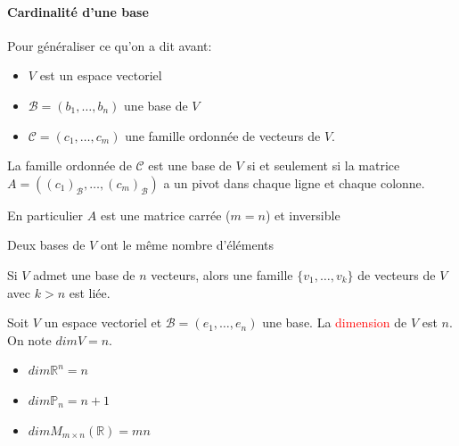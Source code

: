 \paragraph{Cardinalité d'une base}
Pour généraliser ce qu'on a dit avant:
\begin{itemize}
    \item $V$ est un espace vectoriel
    \item $\mathcal{B} = (b_1, \dots, b_n)$ une base de $V$
    \item $\mathcal{C} = (c_1, \dots, c_m)$ une famille ordonnée de vecteurs de $V$.
\end{itemize}

\begin{theoreme}
    La famille ordonnée de $\mathcal{C}$ est une base de $V$ si et seulement si la matrice $A = ((c_1)_{\mathcal{B}}, \dots, (c_m)_{\mathcal{B}})$ a un pivot dans chaque ligne et chaque colonne.
\end{theoreme}
\begin{framedremark}
    En particulier $A$ est une matrice carrée ($m = n$) et inversible
\end{framedremark}
\begin{theoreme}
    Deux bases de $V$ ont le même nombre d'éléments
\end{theoreme}
\begin{corollaire}
Si $V$ admet une base de $n$ vecteurs, alors une famille $\{v_1, \dots, v_k\}$ de vecteurs de $V$ avec $k > n$ est liée.
\end{corollaire}
\begin{definition}
    Soit $V$ un espace vectoriel et $\mathcal{B} = (e_1, \dots, e_n)$ une base. La \textcolor{red}{dimension} de $V$ est $n$. On note $dim V = n$.
\end{definition}

\begin{itemize}
    \item $dim \mathbb{R}^n = n$
    \item $dim \mathbb{P}_n = n+1$
    \item $dim M_{m\times n}(\mathbb{R}) = mn$
\end{itemize}